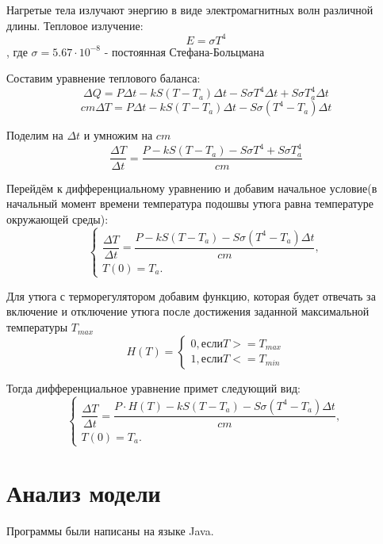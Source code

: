 \documentclass[a4paper, 14pt]{extarticle}
\begin{document}
		Нагретые тела излучают энергию в виде электромагнитных волн различной длины. Тепловое излучение:
		\[ E = \sigma T^4 \]
		, где \( \sigma = 5.67 \cdot 10^{-8} \) - постоянная Стефана-Больцмана
		
		Составим уравнение теплового баланса:
		\[ \Delta Q = P\Delta t - kS(T-T_a) \Delta t - S \sigma T^4 \Delta t +  S \sigma T_a^4 \Delta t\]
		\[ cm \Delta T = P\Delta t - kS(T-T_a) \Delta t - S \sigma (T^4 - T_a) \Delta t \]
		
		Поделим на \( \Delta t\) и умножим на \(cm\)
		\[ \dfrac{\Delta T}{\Delta t} 
		= \dfrac{P - kS(T-T_a) - S \sigma T^4 +  S \sigma T_a^4}{cm}\]
		
		Перейдём к дифференциальному уравнению и добавим начальное условие(в начальный момент времени
		температура подошвы утюга равна температуре окружающей среды):
		\[
			\begin{cases}
				\dfrac{\Delta T}{\Delta t} = \dfrac{P - kS(T-T_a) - S \sigma (T^4 - T_a) \Delta t}{cm},\\
				T(0) = T_a.
			\end{cases}
		\]
		
		Для утюга с терморегулятором добавим функцию, которая будет отвечать за включение и отключение утюга
		после достижения заданной максимальной температуры $T_{max}$
		\[ H(T) = 
			\begin{cases}
				0, \text{если} T >= T_{max}\\
				1, \text{если} T <= T_{min}
			\end{cases} 
		\]
		
		Тогда дифференциальное уравнение примет следующий вид:
		\[
		\begin{cases}
			\dfrac{\Delta T}{\Delta t} = \dfrac{ P\cdot H(T) - kS(T-T_a) - S \sigma (T^4 - T_a) \Delta t}{cm},\\
			T(0) = T_a.
		\end{cases}
		\]
	
	\section{Анализ модели}
		\setlength\parindent{0pt}
		Программы были написаны на языке Java.
\end{document}
